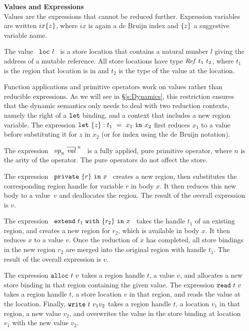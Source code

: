 \eject
\noindent
\textbf{Values and Expressions}\\
Values are the expressions that cannot be reduced further. Expression variables are written $ix\{z\}$, where $ix$ is again a de Bruijn index and $\{z\}$ a suggestive variable name. 

The value ~$\texttt{loc}~ l$~ is a store location that contains a natural number $l$ giving the address of a mutable reference. All store locations have type $\mathit{Ref}~ t_1~ t_2$, where $t_1$ is the region that location is in and $t_2$ is the type of the value at the location.

Function applications and primitive operators work on values rather than reducible expressions. As we will see in \S\ref{s:Dynamics}, this restriction ensures that the dynamic semantics only needs to deal with two reduction contexts, namely the right of a $\texttt{let}$ binding, and a context that includes a new region variable. The expression \mbox{$\texttt{let}~ \{z\} : t_1 ~=~ x_1 ~\texttt{in}~ x_2$} first reduces $x_1$ to a value before substituting it for $z$ in $x_2$ (or for index  using the de Bruijn notation). 

The expression ~$\mathit{op}_n~ \overline{\mathit{val}}^{\; n}$~ is a fully applied, pure primitive operator, where $n$ is the arity of the operator. The pure operators do not affect the store. 

The expression ~$\texttt{private}~ \{r\}~ \texttt{in}~ x$~ creates a new region, then substitutes the corresponding region handle for variable $r$ in body $x$. It then reduces this new body to a value~$v$ and deallocates the region. The result of the overall expression is $v$. 

The expression ~$\texttt{extend}~ t_1~ \texttt{with}~ \{r_2\}~ \texttt{in}~ x$~ takes the handle $t_1$ of an existing region, and creates a new region for $r_2$, which is available in body $x$. It then reduces $x$ to a value $v$. Once the reduction of $x$ has completed, all store bindings in the new region $r_2$ are merged into the original region with handle $t_1$. The result of the overall expression is $v$.

The expression $\texttt{alloc}~ t~ v$ takes a region handle $t$, a value $v$, and allocates a new store binding in that region containing the given value. The expression $\texttt{read}~ t~ v$ takes a region handle $t$, a store location $v$ in that region, and reads the value at the location. Finally, $\texttt{write}~ t~ v_1{v_2}$ takes a region handle $t$, a location $v_1$ in that region, a new value $v_2$, and overwrites the value in the store binding at location $v_1$ with the new value $v_2$.

